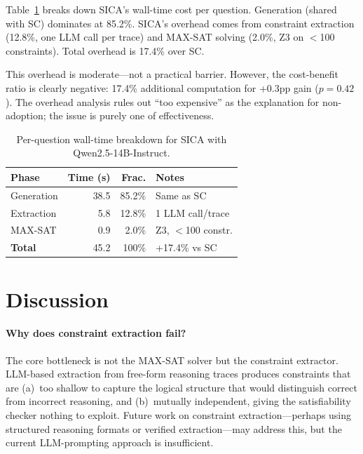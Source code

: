 \documentclass[11pt,a4paper]{article}
\begin{document}
Table~\ref{tab:overhead} breaks down SICA's wall-time cost per question.
Generation (shared with SC) dominates at 85.2\%.
SICA's overhead comes from constraint extraction (12.8\%, one LLM call per trace) and MAX-SAT solving (2.0\%, Z3 on $<$100 constraints).
Total overhead is 17.4\% over SC.

This overhead is moderate---not a practical barrier.
However, the cost-benefit ratio is clearly negative: 17.4\% additional computation for +0.3pp gain ($p=0.42$).
The overhead analysis rules out ``too expensive'' as the explanation for non-adoption; the issue is purely one of effectiveness.

\begin{table}[t]
\centering
\small
\begin{tabular}{lrrl}
\toprule
\textbf{Phase} & \textbf{Time (s)} & \textbf{Frac.} & \textbf{Notes} \\
\midrule
Generation & 38.5 & 85.2\% & Same as SC \\
Extraction & 5.8 & 12.8\% & 1 LLM call/trace \\
MAX-SAT & 0.9 & 2.0\% & Z3, $<$100 constr. \\
\midrule
\textbf{Total} & 45.2 & 100\% & +17.4\% vs SC \\
\bottomrule
\end{tabular}
\caption{Per-question wall-time breakdown for SICA with Qwen2.5-14B-Instruct.}
\label{tab:overhead}
\end{table}

\section{Discussion}
\label{sec:discussion}

\paragraph{Why does constraint extraction fail?}
The core bottleneck is not the MAX-SAT solver but the constraint extractor.
LLM-based extraction from free-form reasoning traces produces constraints that are (a)~too shallow to capture the logical structure that would distinguish correct from incorrect reasoning, and (b)~mutually independent, giving the satisfiability checker nothing to exploit.
Future work on constraint extraction---perhaps using structured reasoning formats or verified extraction---may address this, but the current LLM-prompting approach is insufficient.
\end{document}
